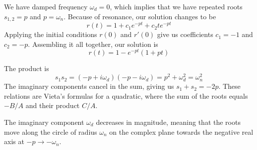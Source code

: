 \documentclass[a4paper]{article}
\begin{document}
\vspace{12pt}


We have damped frequency \( \omega_{d } = 0 \), which implies that we have repeated roots \( s_{1,2} = p  \) and \( p = \omega_{n } \). Because of resonance, our solution changes to be 
\[
	r \!\left( t  \right) = 1 + c_{1}e^{-pt } + c_{2}te^{-pt } 
\]
Applying the initial conditions \( r \!\left( 0 \right) \) and \( r'\!\left( 0 \right) \) give us coefficients \( c_{1} = -1 \) and \( c_{2} = -p  \). Assembling it all together, our solution is
\[
	r \!\left( t  \right) = 1 - e^{-pt } \!\left( 1 + pt \right) 
\]


The product is
\[
	s_{1}s_{2} = \!\left( -p + i \omega_{d } \right)\!\left( -p - i \omega_{d } \right) = p^{2} + \omega^{2}_{d} = \omega^{2}_{n}
\]
The imaginary components cancel in the sum, giving us \( s_{1} + s_{2} = -2p \). These relations are Vieta's formulas for a quadratic, where the sum of the roots equals \( -B/A  \) and their product \( C/A  \).

\vspace{12pt}


The imaginary component \( \omega_{d } \) decreases in magnitude, meaning that the roots move along the circle of radius \( \omega_{n } \) on the complex plane towards the negative real axis at \(-p \rightarrow -\omega_{n } \).

\vspace{12pt}
\end{document}

